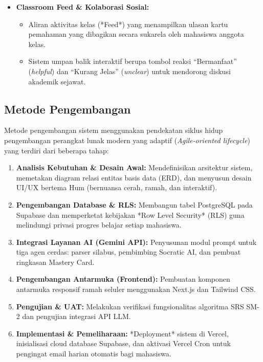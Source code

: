 \documentclass[12pt,a4paper]{article}
\begin{document}
\begin{itemize}
\begin{itemize}
    \end{itemize}
    \item \textbf{Classroom Feed \& Kolaborasi Sosial:}
    \begin{itemize}
        \item Aliran aktivitas kelas (*Feed*) yang menampilkan ulasan kartu pemahaman yang dibagikan secara sukarela oleh mahasiswa anggota kelas.
        \item Sistem umpan balik interaktif berupa tombol reaksi ``Bermanfaat'' (\textit{helpful}) dan ``Kurang Jelas'' (\textit{unclear}) untuk mendorong diskusi akademik sejawat.
    \end{itemize}
\end{itemize}

\subsection{Metode Pengembangan}
Metode pengembangan sistem menggunakan pendekatan siklus hidup pengembangan perangkat lunak modern yang adaptif (\textit{Agile-oriented lifecycle}) yang terdiri dari beberapa tahap:
\begin{enumerate}
    \item \textbf{Analisis Kebutuhan \& Desain Awal:}
    Mendefinisikan arsitektur sistem, memetakan diagram relasi entitas basis data (ERD), dan menyusun desain UI/UX bertema Hum (bernuansa cerah, ramah, dan interaktif).
    \item \textbf{Pengembangan Database \& RLS:}
    Membangun tabel PostgreSQL pada Supabase dan memperketat kebijakan *Row Level Security* (RLS) guna melindungi privasi progres belajar setiap mahasiswa.
    \item \textbf{Integrasi Layanan AI (Gemini API):}
    Penyusunan modul prompt untuk tiga agen cerdas: parser silabus, pembimbing Socratic AI, dan pembuat ringkasan Mastery Card.
    \item \textbf{Pengembangan Antarmuka (Frontend):}
    Pembuatan komponen antarmuka responsif ramah seluler menggunakan Next.js dan Tailwind CSS.
    \item \textbf{Pengujian \& UAT:}
    Melakukan verifikasi fungsionalitas algoritma SRS SM-2 dan pengujian integrasi API LLM.
    \item \textbf{Implementasi \& Pemeliharaan:}
    *Deployment* sistem di Vercel, inisialisasi cloud database Supabase, dan aktivasi Vercel Cron untuk pengingat email harian otomatis bagi mahasiswa.
\end{enumerate}
\end{document}

